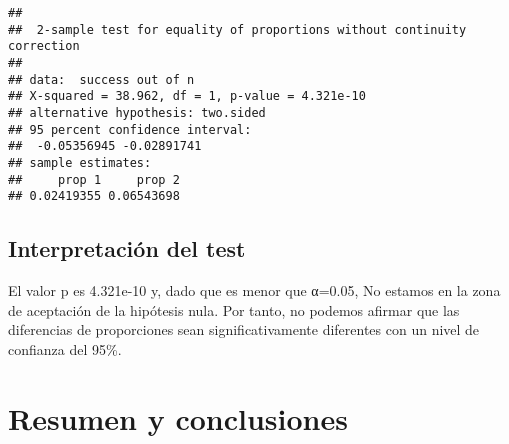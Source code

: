 \documentclass[
]{article}
\begin{document}
\begin{verbatim}
## 
##  2-sample test for equality of proportions without continuity correction
## 
## data:  success out of n
## X-squared = 38.962, df = 1, p-value = 4.321e-10
## alternative hypothesis: two.sided
## 95 percent confidence interval:
##  -0.05356945 -0.02891741
## sample estimates:
##     prop 1     prop 2 
## 0.02419355 0.06543698
\end{verbatim}

\hypertarget{interpretaciuxf3n-del-test-3}{%
\subsection{Interpretación del
test}\label{interpretaciuxf3n-del-test-3}}

El valor p es 4.321e-10 y, dado que es menor que α=0.05, No estamos en
la zona de aceptación de la hipótesis nula. Por tanto, no podemos
afirmar que las diferencias de proporciones sean significativamente
diferentes con un nivel de confianza del 95\%.

\hypertarget{resumen-y-conclusiones}{%
\section{Resumen y conclusiones}\label{resumen-y-conclusiones}}
\end{document}
